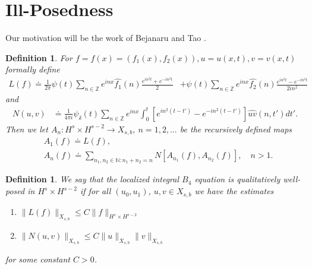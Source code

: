 \documentclass[12pt,reqno]{amsart}
\numberwithin{equation}{section}  %
\newcommand{\zz}{\mathbb{Z}}
\newcommand{\wh}{\widehat}
\newtheorem{definition}[theorem]{Definition}
\begin{document}
\section{Ill-Posedness}
Our motivation will be the work of Bejanaru and Tao
\cite{Bejenaru-Tao-2006-Sharp-well-posedness-and-ill-posedness}. 
%
\begin{definition}
  For $f =f(x)= (f_{1}(x), f_{2}(x)), u = u(x,t), v = v(x,t)$ formally define 
%
%
\begin{equation*}
\begin{split}
  L(f)
  \doteq \frac{1}{2 \pi} \psi(t) \sum_{n \in \zz} e^{inx}
  \wh{f_{1}}(n) \frac{e^{in^{2}t} + e^{-in^{2}t}}{2} 
  & + \psi(t) \sum_{n \in \zz} e^{inx}
  \wh{f_{2}}(n)\frac{e^{in^{2}t} - e^{-in^{2}t}}{2 i n^{2}} 
\end{split}
\end{equation*}
%
%
and
%
%
\begin{equation*}
\begin{split}
N(u, v)
& \doteq \frac{1}{4 \pi i} \psi_{\delta}(t) \sum_{n \in \zz} e^{inx}
    \int_{0}^{t}[e^{in^{2}(t-t')}-e^{-in^{2}(t-t')}]
    \wh{uv}(n, t') dt'.
\end{split}
\end{equation*}
%
%
Then we let $A_{n}: H^{s} \times H^{s-2} \to X_{s,b}, \ n = 1, 2, \dots$ be the
recursively defined maps
%
%
\begin{equation*}
\begin{split}
  & A_{1}(f) \doteq L(f),
  \\
  & A_{n}(f) \doteq \sum_{n_{1}, n_{2} \in \mathbb{N}: n_{1} + n_{2} = n} N\left[
  A_{n_{1}}(f), A_{n_{2}}(f) \right], \quad n > 1.
\end{split}
\end{equation*}

\end{definition}
%
%
\begin{definition}
  We say that the localized integral $B_{4}$ equation
  is \emph{qualitatively well-posed} in $H^{s} \times H^{s-2}$
  if for all $(u_{0}, u_{1})$, $u, v
  \in X_{s,b}$ we have the estimates
  \begin{enumerate}
    \item{$\|L(f)\|_{X_{s,b}} \le C \| f \|_{H^{s} \times
      H^{s-2}}$}
    \item{$\| N(u, v) \|_{X_{s,b}} \le C \| u \|_{X_{s,b}} \| v \|_{X_{s,b}}$} 
  \end{enumerate}
  for some constant $C > 0$.
\end{definition}
%
\end{document}
